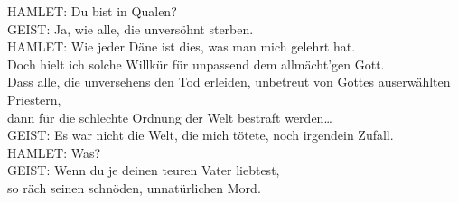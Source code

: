\begin{playdialog}
HAMLET: Du bist in Qualen?\\

GEIST: Ja, wie alle, die unversöhnt sterben.\\

HAMLET: Wie jeder Däne ist dies, was man mich gelehrt hat.\\
Doch hielt ich solche Willkür für unpassend dem allmächt’gen Gott.\\
Dass alle, die unversehens den Tod erleiden, unbetreut von Gottes auserwählten Priestern,\\
dann für die schlechte Ordnung der Welt bestraft werden…\\

GEIST: Es war nicht die Welt, die mich tötete, noch irgendein Zufall.\\

HAMLET: Was?\\

GEIST: Wenn du je deinen teuren Vater liebtest,\\
so räch seinen schnöden, unnatürlichen Mord.\\


\end{playdialog}
